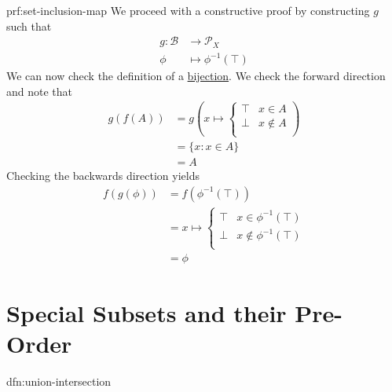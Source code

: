 \begin{prf}{prf:set-inclusion-map}
    We proceed with a constructive proof by constructing \( g \) such that
    \begin{align*}
        g : \mathcal{B} &\to \mathcal{P}_{X} \\
        \phi &\mapsto \phi^{-1}(\top)
    \end{align*}
    We can now check the definition of a \hyperref[dfn:bijection]{bijection}.
    We check the forward direction and note that
    \begin{align*}
        g(f(A)) &= g
        \left(
            x \mapsto
            \begin{cases}
                \top & x \in A \\
                \bot & x \notin A \\
            \end{cases}
        \right) \\
        &= \{ x : x \in A \} \\
        &= A
    \end{align*}
    Checking the backwards direction yields
    \begin{align*}
        f(g(\phi)) &= f\left( \phi^{-1}(\top) \right) \\
        &= x \mapsto
            \begin{cases}
                \top & x \in \phi^{-1}(\top) \\
                \bot & x \notin \phi^{-1}(\top) \\
            \end{cases} \\
        &= \phi
    \end{align*}
\end{prf}

\section{Special Subsets and their Pre-Order}\label{sec:subsets}

\begin{dfn}{dfn:union-intersection}

\end{dfn}


